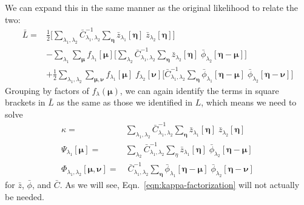 \documentclass[DM,authoryear,toc]{lsstdoc}
\begin{document}
We can expand this in the same manner as the original likelihood to relate the two:
\begin{align}
\bar{L}=&
    \frac{1}{2}
    \Bigg[
        \sum_{\lambda_1,\lambda_2}
        \bar{C}^{-1}_{\lambda_1,\lambda_2}
        \sum_{\bm{\eta}}
        \bar{z}_{\lambda_1}[\bm{\eta}]
        \;\bar{z}_{\lambda_2}[\bm{\eta}]
    \Bigg]
\nonumber\\
&-
    \sum_{\lambda_1}
    \sum_{\bm{\mu}}
        f_{\lambda_1}[\bm{\mu}]
    \Bigg[
        \sum_{\lambda_2}
        \bar{C}^{-1}_{\lambda_1,\lambda_2}
        \sum_{\bm{\eta}}
        \bar{z}_{\lambda_2}[\bm{\eta}]
        \; \bar{\phi}_{\lambda_2}[\bm{\eta}-\bm{\mu}]
    \Bigg]
\nonumber\\
&+
    \frac{1}{2}\sum_{\lambda_1,\lambda_2}
        \sum_{\bm{\mu},\bm{\nu}}
        f_{\lambda_1}[\bm{\mu}]
        \; f_{\lambda_2}[\bm{\nu}]
    \Bigg[
        \bar{C}^{-1}_{\lambda_1,\lambda_2}
        \sum_{\bm{\eta}}
        \bar{\phi}_{\lambda_1}[\bm{\eta}-\bm{\mu}]
        \; \bar{\phi}_{\lambda_2}[\bm{\eta}-\bm{\nu}]
    \Bigg]
\end{align}
Grouping by factors of $f_{\lambda}(\bm{\mu})$, we can again identify the terms in square brackets in $\bar{L}$ as the same as those we identified in $L$, which means we need to solve
\begin{align}
    \kappa = &
        \sum_{\lambda_1,\lambda_2}
        \bar{C}^{-1}_{\lambda_1,\lambda_2}
        \sum_{\bm{\eta}}
        \bar{z}_{\lambda_1}[\bm{\eta}]
        \; \bar{z}_{\lambda_2}[\bm{\eta}]
    \label{eqn:kappa-factorization}
    \\
    \Psi_{\lambda_1}[\bm{\mu}] = &
        \sum_{\lambda_2}
        \bar{C}_{\lambda_1,\lambda_2}^{-1}
        \sum_{\eta}
        \bar{z}_{\lambda_1}[\bm{\eta}]
        \; \bar{\phi}_{\lambda_2}[\bm{\eta}-\bm{\mu}]
    \label{eqn:psi-factorization}
    \\
    \Phi_{\lambda_1,\lambda_2}[\bm{\mu}, \bm{\nu}] = &\;
        \bar{C}^{-1}_{\lambda_1,\lambda_2}
        \sum_{\bm{\eta}}
        \bar{\phi}_{\lambda_1}[\bm{\eta}-\bm{\mu}]
        \; \bar{\phi}_{\lambda_2}[\bm{\eta}-\bm{\nu}]
    \label{eqn:phi-factorization}
\end{align}
for $\bar{z}$, $\bar{\phi}$, and $\bar{C}$.
As we will see, Eqn.~\ref{eqn:kappa-factorization} will not actually be needed.
\end{document}
